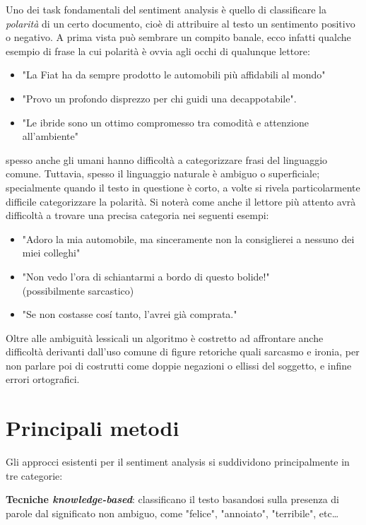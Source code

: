 \documentclass[Lau,binding=0.6cm]{sapthesis}
\begin{document}
Uno dei task fondamentali del sentiment analysis è quello di classificare la
\emph{polarità} di un certo documento, cioè di attribuire al testo un sentimento
positivo o negativo. 
A prima vista può sembrare un compito banale, 
ecco infatti qualche esempio di frase la cui polarità è ovvia agli occhi di qualunque
lettore:

\begin{itemize}
	\item  "La Fiat ha da sempre prodotto le automobili più affidabili al mondo"
	\item  "Provo un profondo disprezzo per chi guidi una decappotabile".
	\item  "Le ibride sono un ottimo compromesso tra comodità e attenzione all'ambiente"
\end{itemize}

		spesso anche gli umani hanno difficoltà a categorizzare frasi del linguaggio comune.
Tuttavia, spesso il linguaggio naturale è ambiguo o superficiale; specialmente
quando il testo in questione è corto, a volte si rivela particolarmente difficile
categorizzare la polarità.
Si noterà come anche il lettore più attento avrà difficoltà a trovare una precisa categoria nei seguenti esempi:

\begin{itemize}
	\item  "Adoro la mia automobile, ma sinceramente non la consiglierei a nessuno dei miei colleghi"
	\item  "Non vedo l'ora di schiantarmi a bordo di questo bolide!" \\(possibilmente sarcastico)
	\item  "Se non costasse cos\'i tanto, l'avrei già comprata."
\end{itemize}

Oltre alle ambiguità lessicali un algoritmo è costretto ad affrontare anche 
difficoltà derivanti dall'uso comune di figure retoriche quali sarcasmo e 
ironia, per non parlare poi di costrutti come doppie negazioni o ellissi del 
soggetto, e infine errori ortografici.


\section{Principali metodi}

Gli approcci esistenti per il sentiment analysis si suddividono principalmente in tre
categorie:

\bigskip

\textbf{Tecniche \emph{knowledge-based}}: classificano il testo basandosi sulla presenza
di parole dal significato non ambiguo, come "felice", "annoiato", "terribile", etc\ldots
\end{document}
